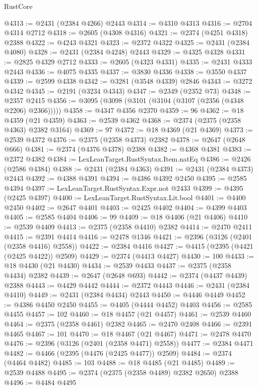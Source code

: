 \begin{lexlean}{RustCore}
\begin{coremodule}
@4313 := @2431 (@2384 @4266) @2443
@4314 := @4310 @4313
@4316 := @2704 @4314 @2712
@4318 := @2605 (@4308 @4316)
@4321 := @2374 (@4251 @4318) @2388
@4322 := @4243 @4321
@4323 := @2372 @4322
@4325 := @2431 (@2384 @4080)
@4328 := @2431 (@2384 @4248) @2443
@4329 := @4325 @4328
@4331 := @2825 @4329 @2712
@4333 := @2605 (@4323 @4331)
@4335 := @2431 @4333 @2443
@4336 := @4075 @4335
@4337 := @3830 @4336
@4338 := @3550 @4337
@4339 := @2599 @4338
@4342 := @3281 (@3548 @4339) @2846
@4343 := @3272 @4342
@4345 := @2191 (@3234 @4343)
@4347 := @2349 (@2352 @73)
@4348 := @2357 @2415
@4356 := @3095 (@3098 (@3101 (@3104 (@3107 (@2356 (@4348 @2206) @2366)))))
@4358 := @4347 @4356 @2370
@4359 := 96
@4362 := @18 @4359 (@21 @4359)
@4363 := @2539 @4362
@4368 := @2374 (@2375 (@2358 @4363) @2382 @3164)
@4369 := 97
@4372 := @18 @4369 (@21 @4369)
@4373 := @2539 @4372
@4376 := @2375 (@2358 @4373) @2382
@4378 := @2647 (@2648 @666)
@4381 := @2374 (@4376 @4378) @2388
@4382 := @4368 @4381
@4383 := @2372 @4382
@4384 := LexLeanTarget.RustSyntax.Item.natEq
@4386 := @2426 (@2586 @4384)
@4388 := @2431 (@2384 @4363)
@4391 := @2431 (@2384 @4373) @2443
@4392 := @4388 @4391
@4394 := @4386 @4392 @2450
@4395 := @2585 @4394
@4397 := LexLeanTarget.RustSyntax.Expr.not @2433
@4399 := @4395 (@2425 @4397)
@4400 := LexLeanTarget.RustSyntax.Lit.bool
@4401 := @4400 @2450
@4402 := @2647 @4401
@4403 := @2425 @4402
@4404 := @4399 @4403
@4405 := @2585 @4404
@4406 := 99
@4409 := @18 @4406 (@21 @4406)
@4410 := @2539 @4409
@4413 := @2375 (@2358 @4410) @2382
@4414 := @2470 @2411
@4415 := @2391 @4414
@4416 := @2478 @1346
@4421 := @2396 (@3126 (@2401 (@2358 @4416) @2558))
@4422 := @2384 @4416
@4427 := @4415 (@2395 (@4421 (@2425 @4422)) @2509)
@4429 := @2374 (@4413 @4427)
@4430 := 100
@4433 := @18 @4430 (@21 @4430)
@4434 := @2539 @4433
@4437 := @2375 (@2358 @4434) @2382
@4439 := @2647 (@2648 @693)
@4442 := @2374 (@4437 @4439) @2388
@4443 := @4429 @4442
@4444 := @2372 @4443
@4446 := @2431 (@2384 @4410)
@4449 := @2431 (@2384 @4434) @2443
@4450 := @4446 @4449
@4452 := @4386 @4450 @2450
@4455 := @4405 (@4444 @4452) @4403
@4456 := @2585 @4455
@4457 := 102
@4460 := @18 @4457 (@21 @4457)
@4461 := @2539 @4460
@4464 := @2375 (@2358 @4461) @2382
@4465 := @2470 @2408
@4466 := @2391 @4465
@4467 := 101
@4470 := @18 @4467 (@21 @4467)
@4471 := @2478 @4470
@4476 := @2396 (@3126 (@2401 (@2358 @4471) @2558))
@4477 := @2384 @4471
@4482 := @4466 (@2395 (@4476 (@2425 @4477)) @2509)
@4484 := @2374 (@4464 @4482)
@4485 := 103
@4488 := @18 @4485 (@21 @4485)
@4489 := @2539 @4488
@4495 := @2374 (@2375 (@2358 @4489) @2382 @2650) @2388
@4496 := @4484 @4495

\end{coremodule}
\end{lexlean}
